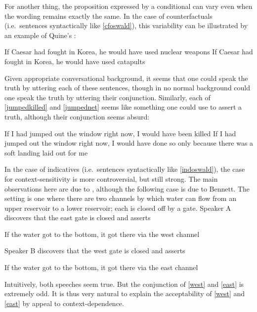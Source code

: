 \documentclass[If.tex]{subfiles}
\begin{document}
For another thing, the proposition expressed by a conditional can vary even when the wording remains exactly the same. In the case of counterfactuals (i.e.~sentences syntactically like \ref{cfoswald}), this variability can be illustrated by an example of Quine's \parencite[described by][]{LewisCounterfactuals}:
\begin{prop}
	\nitem
	\begin{prop}
		\aitem \label{nukes}
			If Caesar had fought in Korea, he would have used nuclear weapons
		\aitem \label{catapults}
			If Caesar had fought in Korea, he would have used catapults
	\end{prop}
\end{prop}
Given appropriate conversational background, it seems that one could speak the truth by uttering each of these sentences, though in no normal background could one speak the truth by uttering their conjunction. Similarly, each of \ref{jumpedkilled} and \ref{jumpednet} \citep{JacksonCTC} seems like something one could use to assert a truth, although their conjunction seems absurd:
\begin{prop}
	\nitem	
	\begin{prop}
		\aitem \label{jumpedkilled}
		If I had jumped out the window right now, I would have been killed
		\aitem \label{jumpednet}
		If I had jumped out the window right now, I would have done so only because there was a soft landing laid out for me
	\end{prop}
\end{prop}
In the case of indicatives (i.e.~sentences syntactically like \ref{indoswald}), the case for context-sensitivity is more controversial, but still strong. The main observations here are due to \citet{GibbardTRTC}, although the following case is due to Bennett. The setting is one where there are two channels by which water can flow from an upper reservoir to a lower reservoir; each is closed off by a gate. Speaker A discovers that the east gate is closed and asserts
\begin{prop}
	\nitem \label{west}
	If the water got to the bottom, it got there via the west channel%
\end{prop}
Speaker B discovers that the west gate is closed and asserts
\begin{prop}
	\nitem \label{east}
	If the water got to the bottom, it got there via the east channel%
\end{prop}
Intuitively, both speeches seem true.  But the conjunction of \ref{west} and \ref{east} is extremely odd. It is thus very natural to explain the acceptability of \ref{west} and \ref{east} by appeal to context-dependence.
\end{document}

